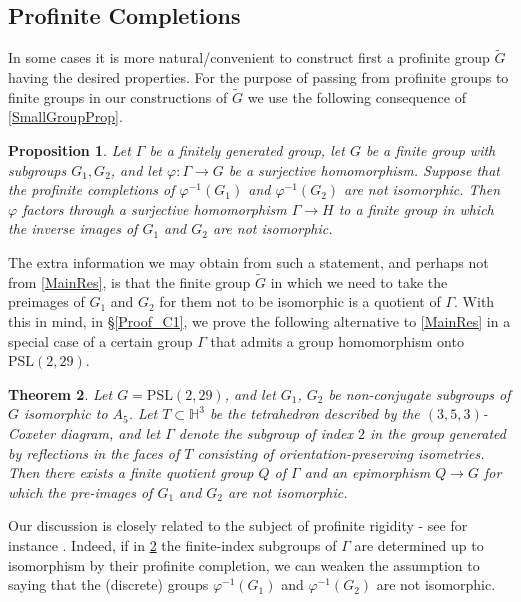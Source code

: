 \documentclass[11pt]{amsart}
\newtheorem{thm}{Theorem}[section]
\newtheorem{prop}[thm]{Proposition}
\numberwithin{equation}{section}
\begin{document}
\subsection{Profinite Completions}

In some cases it is more natural/convenient to construct first a profinite group $\widetilde G$ having the desired properties. For the purpose of passing from profinite groups to finite groups in our constructions of $\widetilde G$ we use the following consequence of \cref{SmallGroupProp}.

\begin{prop} \label{CorProfComp}
Let $\Gamma$ be a finitely generated group, let $G$ be a finite group with subgroups $G_1, G_2$, and let $\varphi \colon \Gamma \to G$ be a surjective homomorphism. Suppose that the profinite completions of $\varphi^{-1}(G_1)$ and $\varphi^{-1}(G_2)$ are not isomorphic. Then $\varphi$ factors through a surjective homomorphism $\Gamma \to H$ to a finite group in which the inverse images of $G_1$ and $G_2$ are not isomorphic.
\end{prop}

The extra information we may obtain from such a statement, and perhaps not from \cref{MainRes}, is that the finite group $\widetilde G$ in which we need to take the preimages of $G_1$ and $G_2$ for them not to be isomorphic is a quotient of $\Gamma$. With this in mind, in \S  \ref{Proof_C1}, we prove the following alternative to \cref{MainRes} in a special case of a certain group $\Gamma$ that admits a group homomorphism onto $\mathrm{PSL}(2, 29)$.

\begin{thm}\label{C:1}
Let $G=\mathrm{PSL}(2,29)$, and let $G_1$, $G_2$ be non-conjugate subgroups of $G$ isomorphic to $A_5$. Let $T \subset \mathbb{H}^3$ be the tetrahedron described by the $(3,5,3)$-Coxeter diagram, and let $\Gamma$ denote the subgroup of index $2$ in the group generated by reflections in the faces of $T$ consisting of orientation-preserving isometries. Then there exists a finite quotient group $Q$ of $\Gamma$ and an epimorphism $Q \to G$ for which the pre-images of $G_1$ and $G_2$ are not isomorphic.
\end{thm}

Our discussion is closely related to the subject of profinite rigidity - see for instance \cite{Rei}. Indeed, if in \cref{C:1} the finite-index subgroups of $\Gamma$ are determined up to isomorphism by their profinite completion, we can weaken the assumption to saying that the (discrete) groups $\varphi^{-1}(G_1)$ and $\varphi^{-1}(G_2)$ are not isomorphic.
\end{document}
